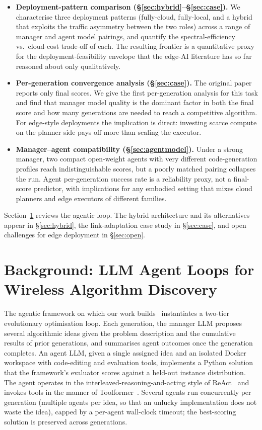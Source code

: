 \documentclass[journal]{IEEEtran}
\begin{document}
\begin{itemize}
    \item \textbf{Deployment-pattern comparison (\S\ref{sec:hybrid}--\S\ref{sec:case}).} We characterise three deployment patterns (fully-cloud, fully-local, and a hybrid that exploits the traffic asymmetry between the two roles) across a range of manager and agent model pairings, and quantify the spectral-efficiency vs.\ cloud-cost trade-off of each. The resulting frontier is a quantitative proxy for the deployment-feasibility envelope that the edge-AI literature has so far reasoned about only qualitatively.
    \item \textbf{Per-generation convergence analysis (\S\ref{sec:case}).} The original paper~\cite{aitaoudia2026aite} reports only final scores. We give the first per-generation analysis for this task and find that manager model quality is the dominant factor in both the final score and how many generations are needed to reach a competitive algorithm. For edge-style deployments the implication is direct: investing scarce compute on the planner side pays off more than scaling the executor.
    \item \textbf{Manager--agent compatibility (\S\ref{sec:agentmodel}).} Under a strong manager, two compact open-weight agents with very different code-generation profiles reach indistinguishable scores, but a poorly matched pairing collapses the run. Agent per-generation success rate is a reliability proxy, not a final-score predictor, with implications for any embodied setting that mixes cloud planners and edge executors of different families.
\end{itemize}

Section~\ref{sec:background} reviews the agentic loop. The hybrid architecture and its alternatives appear in \S\ref{sec:hybrid}, the link-adaptation case study in \S\ref{sec:case}, and open challenges for edge deployment in \S\ref{sec:open}.

\section{Background: LLM Agent Loops for Wireless Algorithm Discovery}
\label{sec:background}

The agentic framework on which our work builds~\cite{aitaoudia2026aite} instantiates a two-tier evolutionary optimisation loop. Each generation, the manager LLM proposes several algorithmic ideas given the problem description and the cumulative results of prior generations, and summarises agent outcomes once the generation completes. An agent LLM, given a single assigned idea and an isolated Docker workspace with code-editing and evaluation tools, implements a Python solution that the framework's evaluator scores against a held-out instance distribution. The agent operates in the interleaved-reasoning-and-acting style of ReAct~\cite{yao2023react} and invokes tools in the manner of Toolformer~\cite{schick2023toolformer}. Several agents run concurrently per generation (multiple agents per idea, so that an unlucky implementation does not waste the idea), capped by a per-agent wall-clock timeout; the best-scoring solution is preserved across generations.
\end{document}
